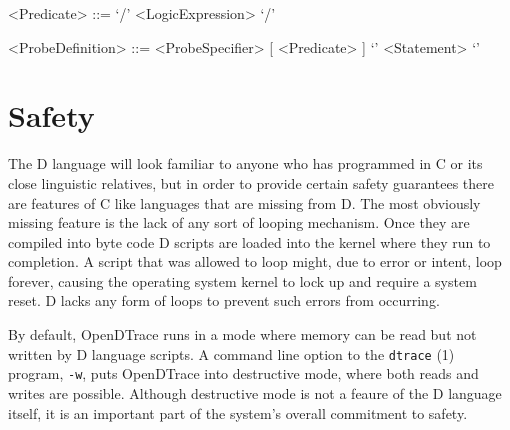 \begin{grammar}
<Predicate> ::= `/' <LogicExpression> `/'
\end{grammar}

%
%

\begin{grammar}
<ProbeDefinition> ::= <ProbeSpecifier> [ <Predicate> ] `{'  { <Statement> } `}'
\end{grammar}


\section{Safety}
\label{sec:safety}

The D language will look familiar to anyone who has programmed in C or
its close linguistic relatives, but in order to provide certain
safety guarantees there are features of C like languages that are
missing from D.  The most obviously missing feature is the lack of any
sort of looping mechanism.  Once they are compiled into byte code D
scripts are loaded into the kernel where they run to completion.  A
script that was allowed to loop might, due to error or intent, loop
forever, causing the operating system kernel to lock up and require a
system reset.  D lacks any form of loops to prevent such errors from
occurring.

By default, OpenDTrace runs in a mode where memory can be read but not
written by D language scripts.  A command line option to the \texttt{dtrace} (1)
program, \texttt{-w}, puts OpenDTrace into destructive mode, where both reads
and writes are possible.  Although destructive mode is not a feaure of
the D language itself, it is an important part of the system's overall
commitment to safety.



